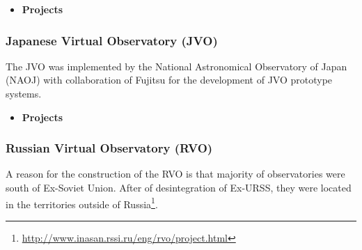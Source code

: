\begin{itemize}
	\item \textbf{Projects}
\end{itemize}

\subsubsection{Japanese Virtual Observatory (JVO)}
The JVO was implemented by the National Astronomical Observatory
of Japan (NAOJ) with collaboration of Fujitsu for the development of JVO
prototype systems.

\begin{itemize}
	\item \textbf{Projects}
\end{itemize}

\subsubsection{Russian Virtual Observatory (RVO)}
A reason for the construction of the RVO is that majority of observatories were
south of Ex-Soviet Union. After of desintegration of Ex-URSS, they were located
in the territories outside of
Russia\footnote{\url{http://www.inasan.rssi.ru/eng/rvo/project.html}}.
